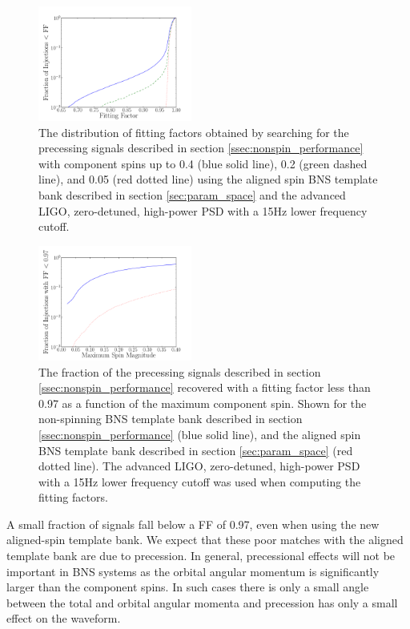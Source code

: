 \begin{figure}
\includegraphics[width=0.45\textwidth]{papers/bns_spin/figure10.pdf}
\caption{\label{fig:anstar-prec} The distribution of fitting factors obtained by searching
for the precessing signals described in section \ref{ssec:nonspin_performance}
with component spins up to 0.4 (blue solid line), 0.2 (green dashed line), and 0.05 (red dotted line) using the aligned spin
BNS template bank described in section \ref{sec:param_space} and the advanced LIGO, zero-detuned,
high-power PSD with a 15Hz lower frequency cutoff.}
\end{figure}
\begin{figure}
\includegraphics[width=0.45\textwidth]{papers/bns_spin/figure11.pdf}
\caption{\label{fig:anstar-st-spin} The fraction of the precessing signals described in
section \ref{ssec:nonspin_performance} recovered with a fitting factor less than 0.97 as
a function of the maximum component spin. Shown for the non-spinning
BNS template bank described in section \ref{ssec:nonspin_performance} (blue solid line),
and the aligned spin
BNS template bank described in section \ref{sec:param_space} (red dotted line). The advanced LIGO, zero-detuned,
high-power PSD with a 15Hz lower frequency cutoff was used when computing the fitting factors.}
\end{figure}

A small fraction of signals fall below a FF of 0.97, even when using the new aligned-spin template bank.
We expect that these poor matches with the aligned template bank are
due to precession. In general, precessional effects will not be important in BNS systems
as the orbital angular momentum is significantly larger than the component spins.
In such cases there is only a small angle between the total and orbital angular momenta
and precession has only a small effect on the waveform.

